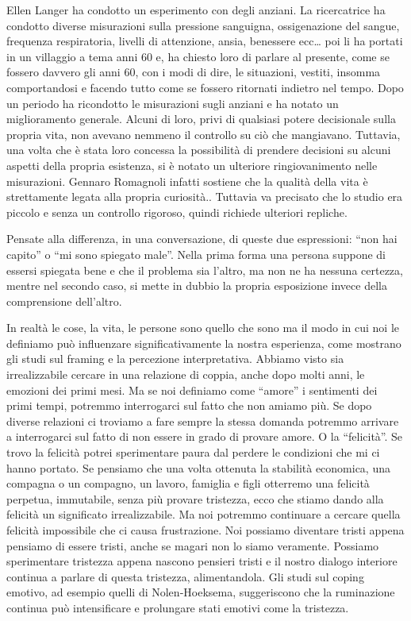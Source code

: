 \documentclass[12pt]{book} %
\begin{document}
Ellen Langer ha condotto un esperimento con degli anziani. La ricercatrice ha condotto diverse misurazioni sulla
pressione sanguigna, ossigenazione del sangue, frequenza respiratoria, livelli di attenzione, ansia, benessere ecc…
poi li ha portati in un villaggio a tema anni 60 e, ha chiesto loro di parlare al presente, come se fossero davvero gli
anni 60, con i modi di dire, le situazioni, vestiti, insomma comportandosi e facendo tutto come se fossero ritornati
indietro nel tempo. Dopo un periodo ha ricondotto le misurazioni sugli anziani e ha notato un miglioramento generale.
Alcuni di loro, privi di qualsiasi potere decisionale sulla propria vita, non avevano nemmeno il controllo su ciò che
mangiavano. Tuttavia, una volta che è stata loro concessa la possibilità di prendere decisioni su alcuni aspetti della
propria esistenza, si è notato un ulteriore ringiovanimento nelle misurazioni. Gennaro Romagnoli infatti sostiene che
la qualità della vita è strettamente legata alla propria
curiosità.. Tuttavia va precisato che lo studio era piccolo e senza un controllo rigoroso, quindi richiede ulteriori repliche.

Pensate alla differenza, in una conversazione, di queste due espressioni: “non hai capito” o “mi sono spiegato male”.
Nella prima forma una persona suppone di essersi spiegata bene e che il problema sia l'altro, ma non ne ha nessuna
certezza, mentre nel secondo caso, si mette in dubbio la propria esposizione invece della comprensione dell'altro.

In realtà le cose, la vita, le persone sono quello che sono ma il modo in cui noi le definiamo può influenzare significativamente la nostra esperienza, come mostrano gli studi sul framing e la percezione interpretativa. Abbiamo visto sia irrealizzabile cercare in una relazione di coppia, anche dopo molti anni, le
emozioni dei primi mesi. Ma se noi definiamo come “amore” i sentimenti dei primi tempi, potremmo interrogarci sul fatto
che non amiamo più. Se dopo diverse relazioni ci troviamo a fare sempre la stessa domanda potremmo arrivare a
interrogarci sul fatto di non essere in grado di provare amore. O la “felicità”. Se trovo la felicità potrei sperimentare paura dal perdere le condizioni che mi ci hanno portato. Se pensiamo che una volta ottenuta la stabilità economica, una
compagna o un compagno, un lavoro, famiglia e figli otterremo una felicità perpetua, immutabile, senza più provare
tristezza, ecco che stiamo dando alla felicità un significato irrealizzabile. Ma noi potremmo continuare a cercare quella
felicità impossibile che ci causa frustrazione. Noi possiamo diventare tristi appena pensiamo di essere tristi, anche se magari non lo
siamo veramente. Possiamo sperimentare tristezza appena nascono pensieri tristi e il nostro dialogo interiore continua a parlare di
questa tristezza, alimentandola. Gli studi sul coping emotivo, ad esempio quelli di Nolen‑Hoeksema, suggeriscono che la ruminazione continua può intensificare e prolungare stati emotivi come la tristezza.
\end{document}
